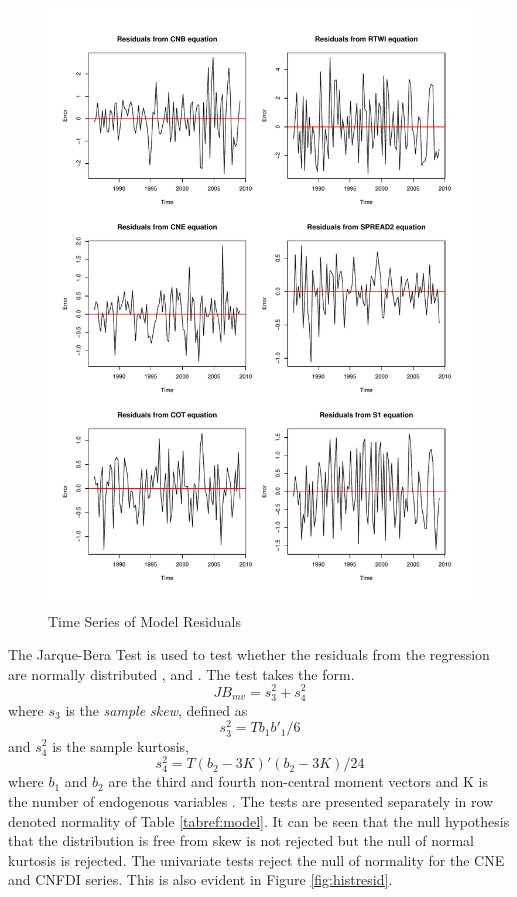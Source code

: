 \documentclass[12pt, a4paper, oneside]{article}\usepackage[]{graphicx}\usepackage[]{color}
\begin{document}
\begin{figure}[t]
\graphicspath{{Pictures/C2/}}
\centering
\caption{Time Series of Model Residuals}
\label{fig:tsresid}
\includegraphics[scale=0.6] {residts}
\end{figure} 

The Jarque-Bera Test is used to test whether the residuals from the regression are normally distributed \citep{JB1980}, \citep{JB1981} and \citep{JB1987}.  The test takes the form. 
\begin{equation}
JB_{mv} = s_3^2 + s_4^2
\end{equation}
where $s_3$ is the \emph{sample skew}, defined as 
\begin{equation}
s_3^2 = Tb_1b'_1/6
\end{equation}
and $s_4^2$ is the sample kurtosis,
\begin{equation}
s_4^2 = T(b_2 - 3K)'(b_2 - 3K)/24
\end{equation}
where $b_1$ and $b_2$ are the third and fourth non-central moment vectors and K is the number of endogenous variables \citep[p. 31]{varsb}.  The tests are presented separately in row denoted normality of Table \ref{tabref:model}.  It can be seen that the null hypothesis that the distribution is free from skew is not rejected but the null of normal kurtosis is rejected.  The univariate tests reject the null of normality for the CNE and CNFDI series.   This is also evident in Figure \ref{fig:histresid}.
\end{document}
